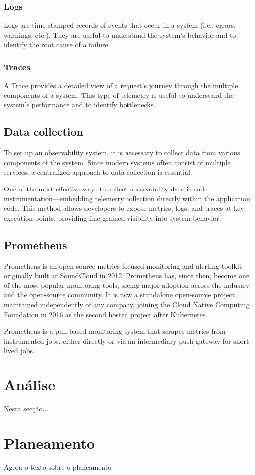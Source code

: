 \documentclass[a4paper,twoside,11pt]{article}
\begin{document}
\subsubsection{Logs}
Logs are time-stamped records of events that occur in a system (i.e., errors, warnings, etc.). 
They are useful to understand the system's behavior and to identify the root cause of a failure.

\subsubsection{Traces}
A Trace provides a detailed view of a request's journey through the multiple components of a system.
This type of telemetry is useful to understand the system's performance and to identify bottlenecks.

\subsection{Data collection}
To set up an observability system, it is necessary to collect data from various components of the system. Since modern systems often consist of multiple services, a centralized approach to data collection is essential.


One of the most effective ways to collect observability data is code instrumentation—embedding telemetry collection directly within the application code. 
This method allows developers to expose metrics, logs, and traces at key execution points, providing fine-grained visibility into system behavior.

\subsection{Prometheus}
Prometheus \cite{prometheus:prometheus} is an open-source metrics-focused monitoring and alerting toolkit originally built at SoundCloud in 2012. Prometheus has, since then, become one of the most popular monitoring tools, seeing major adoption across the industry and the open-source community.
It is now a standalone open-source project maintained independently of any company, joining the Cloud Native Computing Foundation in 2016 as the second hosted project after Kubernetes.

Prometheus is a pull-based monitoring system that scrapes metrics from instrumented jobs, either directly or via an intermediary push gateway for short-lived jobs.


\section{Análise}
Nesta secção...

\section{Planeamento}
Agora o texto sobre o planeamento



\end{document}

